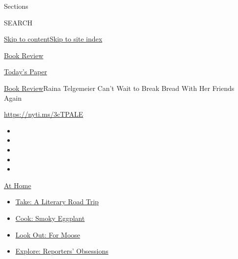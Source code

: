 Sections

SEARCH

\protect\hyperlink{site-content}{Skip to
content}\protect\hyperlink{site-index}{Skip to site index}

\href{https://www.nytimes3xbfgragh.onion/section/books/review}{Book
Review}

\href{https://myaccount.nytimes3xbfgragh.onion/auth/login?response_type=cookie\&client_id=vi}{}

\href{https://www.nytimes3xbfgragh.onion/section/todayspaper}{Today's
Paper}

\href{/section/books/review}{Book Review}\textbar{}Raina Telgemeier
Can't Wait to Break Bread With Her Friends Again

\url{https://nyti.ms/3cTPALE}

\begin{itemize}
\item
\item
\item
\item
\item
\end{itemize}

\href{https://www.nytimes3xbfgragh.onion/spotlight/at-home?action=click\&pgtype=Article\&state=default\&region=TOP_BANNER\&context=at_home_menu}{At
Home}

\begin{itemize}
\tightlist
\item
  \href{https://www.nytimes3xbfgragh.onion/2020/07/28/books/time-for-a-literary-road-trip.html?action=click\&pgtype=Article\&state=default\&region=TOP_BANNER\&context=at_home_menu}{Take:
  A Literary Road Trip}
\item
  \href{https://www.nytimes3xbfgragh.onion/2020/07/29/magazine/bored-with-your-home-cooking-some-smoky-eggplant-will-fix-that.html?action=click\&pgtype=Article\&state=default\&region=TOP_BANNER\&context=at_home_menu}{Cook:
  Smoky Eggplant}
\item
  \href{https://www.nytimes3xbfgragh.onion/2020/07/27/travel/moose-michigan-isle-royale.html?action=click\&pgtype=Article\&state=default\&region=TOP_BANNER\&context=at_home_menu}{Look
  Out: For Moose}
\item
  \href{https://www.nytimes3xbfgragh.onion/interactive/2020/at-home/even-more-reporters-editors-diaries-lists-recommendations.html?action=click\&pgtype=Article\&state=default\&region=TOP_BANNER\&context=at_home_menu}{Explore:
  Reporters' Obsessions}
\end{itemize}

